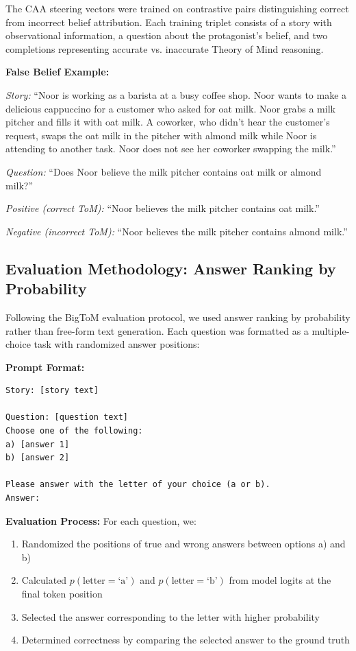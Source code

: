 \documentclass{article}
\begin{document}
The CAA steering vectors were trained on contrastive pairs distinguishing correct from incorrect belief attribution. Each training triplet consists of a story with observational information, a question about the protagonist's belief, and two completions representing accurate vs. inaccurate Theory of Mind reasoning.

\textbf{False Belief Example:}

\textit{Story:} ``Noor is working as a barista at a busy coffee shop. Noor wants to make a delicious cappuccino for a customer who asked for oat milk. Noor grabs a milk pitcher and fills it with oat milk. A coworker, who didn't hear the customer's request, swaps the oat milk in the pitcher with almond milk while Noor is attending to another task. Noor does not see her coworker swapping the milk.''

\textit{Question:} ``Does Noor believe the milk pitcher contains oat milk or almond milk?''

\textit{Positive (correct ToM):} ``Noor believes the milk pitcher contains oat milk.''

\textit{Negative (incorrect ToM):} ``Noor believes the milk pitcher contains almond milk.''

\subsection{Evaluation Methodology: Answer Ranking by Probability}

Following the BigToM evaluation protocol, we used answer ranking by probability rather than free-form text generation. Each question was formatted as a multiple-choice task with randomized answer positions:

\textbf{Prompt Format:}
\begin{verbatim}
Story: [story text]

Question: [question text]
Choose one of the following:
a) [answer 1]
b) [answer 2]

Please answer with the letter of your choice (a or b).
Answer:
\end{verbatim}

\textbf{Evaluation Process:}
For each question, we:
\begin{enumerate}
    \item Randomized the positions of true and wrong answers between options a) and b)
    \item Calculated $p(\text{letter}=\text{`a'})$ and $p(\text{letter}=\text{`b'})$ from model logits at the final token position
    \item Selected the answer corresponding to the letter with higher probability
    \item Determined correctness by comparing the selected answer to the ground truth
\end{enumerate}
\end{document}
